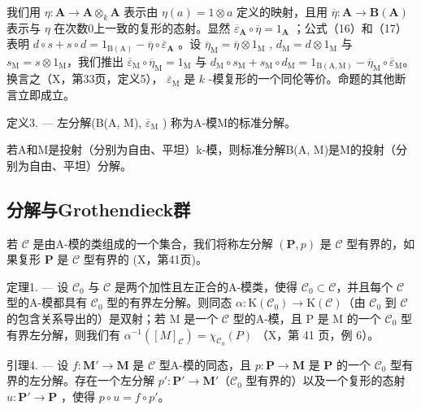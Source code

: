 我们用 \(\eta: \mathbf{A} \to \mathbf{A} \otimes_k \mathbf{A}\) 表示由 \(\eta(a) = 1 \otimes a\) 定义的映射，且用 \(\overline{\eta}: \mathbf{A} \to \mathbf{B}(\mathbf{A})\) 表示与 \(\eta\) 在次数0上一致的复形的态射。显然 \(\overline{\varepsilon}_{\mathbf{A}} \circ \overline{\eta} = 1_{\mathbf{A}}\) ；公式（16）和（17）表明 \(d \circ s + s \circ d = 1_{\mathrm{B(A)}} - \overline{\eta} \circ \overline{\varepsilon}_{\mathbf{A}}\) 。设 \(\overline{\eta}_{\mathrm{M}} = \overline{\eta} \otimes 1_{\mathrm{M}}\) , \(d_{\mathrm{M}} = d \otimes 1_{\mathrm{M}}\) 与 \(s_{\mathrm{M}} = s \otimes 1_{\mathrm{M}}\)，我们推出 \(\overline{\varepsilon}_{\mathrm{M}} \circ \overline{\eta}_{\mathrm{M}} = 1_{\mathrm{M}}\) 与 \(d_{\mathrm{M}} \circ s_{\mathrm{M}} + s_{\mathrm{M}} \circ d_{\mathrm{M}} = 1_{\mathrm{B(A,M)}} - \overline{\eta}_{\mathrm{M}} \circ \overline{\varepsilon}_{\mathrm{M}}\)。换言之（X，第33页，定义5）， \(\overline{\varepsilon}_{\mathrm{M}}\) 是 \(k\) -模复形的一个同伦等价。命题的其他断言立即成立。

定义3. --- 左分解(B(A, M), \(\overline{\varepsilon}_{\mathrm{M}}\) ) 称为A-模M的标准分解。

若A和M是投射（分别为自由、平坦）k-模，则标准分解B(A, M)是M的投射（分别为自由、平坦）分解。

\subsection{分解与Grothendieck群}

若 \(\mathcal{C}\) 是由A-模的类组成的一个集合，我们将称左分解 \((\mathbf{P}, p)\) 是 \(\mathcal{C}\) 型有界的，如果复形 \(\mathbf{P}\) 是 \(\mathcal{C}\) 型有界的 (X，第41页)。

定理1. --- 设 \(\mathcal{C}_{0}\) 与 \(\mathcal{C}\) 是两个加性且左正合的A-模类，使得 \(\mathcal{C}_{0} \subset \mathcal{C}\)，并且每个 \(\mathcal{C}\) 型的A-模都具有 \(\mathcal{C}_{0}\) 型的有界左分解。则同态 \(\alpha : \mathrm{K}(\mathcal{C}_{0}) \to \mathrm{K}(\mathcal{C})\)（由 \(\mathcal{C}_{0}\) 到 \(\mathcal{C}\) 的包含关系导出的）是双射；若 M 是一个 \(\mathcal{C}\) 型的A-模，且 P 是 M 的一个 \(\mathcal{C}_{0}\) 型有界左分解，则我们有 \(\alpha^{-1}([M]_{\mathcal{C}}) = \chi_{\mathcal{C}_{0}}(P)\) （X，第 41 页，例 6）。

引理4. --- 设 \(f: \mathbf{M}' \to \mathbf{M}\) 是 \(\mathcal{C}\) 型A-模的同态，且 \(p: \mathbf{P} \to \mathbf{M}\) 是 \(\mathbf{P}\) 的一个 \(\mathcal{C}_0\) 型有界的左分解。存在一个左分解 \(p': \mathbf{P}' \to \mathbf{M}'\)（\(\mathcal{C}_0\) 型有界的）以及一个复形的态射 \(u: \mathbf{P}' \to \mathbf{P}\) ，使得 \(p \circ u = f \circ p'\)。

